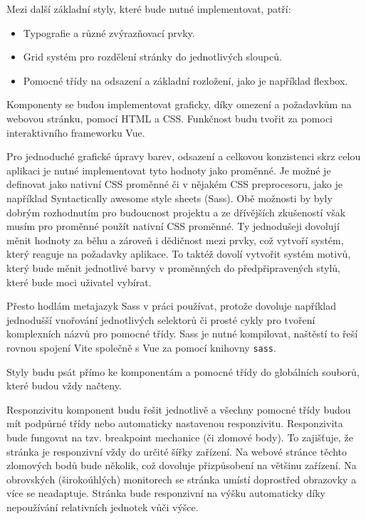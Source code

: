 Mezi další základní styly, které bude nutné implementovat, patří:

\begin{itemize}
    \item Typografie a různé zvýrazňovací prvky.
    \item Grid systém pro rozdělení stránky do jednotlivých sloupců.
    \item Pomocné třídy na odsazení a základní rozložení, jako je například flexbox.
\end{itemize}

Komponenty se budou implementovat graficky, díky omezení a požadavkům na webovou stránku, pomocí HTML a CSS.
Funkčnost budu tvořit za pomoci interaktivního frameworku Vue.

Pro jednoduché grafické úpravy barev, odsazení a celkovou konzistenci skrz celou aplikaci je nutné implementovat tyto hodnoty jako proměnné.
Je možné je definovat jako nativní CSS proměnné či v nějakém CSS preprocesoru, jako je například Syntactically awesome style sheets (Sass).
Obě možnosti by byly dobrým rozhodnutím pro budoucnost projektu a ze dřívějších zkušeností však musím pro proměnné použít nativní CSS proměnné.
Ty jednodušeji dovolují měnit hodnoty za běhu a zároveň i dědičnost mezi prvky, což vytvoří systém, který reaguje na požadavky aplikace.
To taktéž dovolí vytvořit systém motivů, který bude měnit jednotlivé barvy v proměnných do předpřipravených stylů, které bude moci uživatel vybírat.

Přesto hodlám metajazyk Sass v práci používat, protože dovoluje například jednodušší vnořování jednotlivých selektorů či prosté cykly pro tvoření komplexních názvů pro pomocné třídy.
Sass je nutné kompilovat, naštěstí to řeší rovnou spojení Vite společně s Vue za pomocí knihovny \texttt{sass}.

Styly budu psát přímo ke komponentám a pomocné třídy do globálních souborů, které budou vždy načteny.

Responzivitu komponent budu řešit jednotlivě a všechny pomocné třídy budou mít podpůrné třídy nebo automaticky nastavenou responzivitu.
Responzivita bude fungovat na tzv. breakpoint mechanice (či zlomové body).
To zajišťuje, že stránka je responzivní vždy do určité šířky zařízení.
Na webové stránce těchto zlomových bodů bude několik, což dovoluje přizpůsobení na většinu zařízení.
Na obrovských (širokoúhlých) monitorech se stránka umístí doprostřed obrazovky a více se neadaptuje.
Stránka bude responzivní na výšku automaticky díky nepoužívání relativních jednotek vůči výšce.

